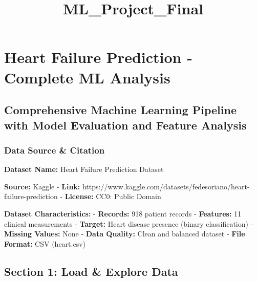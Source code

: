 \documentclass[11pt]{article}
\title{ML\_Project\_Final}
\begin{document}
    
    \maketitle
    
    

    
    \section{Heart Failure Prediction - Complete ML
Analysis}\label{heart-failure-prediction---complete-ml-analysis}

\subsection{Comprehensive Machine Learning Pipeline with Model
Evaluation and Feature
Analysis}\label{comprehensive-machine-learning-pipeline-with-model-evaluation-and-feature-analysis}

    \subsubsection{Data Source \& Citation}\label{data-source-citation}

\textbf{Dataset Name:} Heart Failure Prediction Dataset

\textbf{Source:} Kaggle - \textbf{Link:}
https://www.kaggle.com/datasets/fedesoriano/heart-failure-prediction -
\textbf{License:} CC0: Public Domain

\textbf{Dataset Characteristics:} - \textbf{Records:} 918 patient
records - \textbf{Features:} 11 clinical measurements - \textbf{Target:}
Heart disease presence (binary classification) - \textbf{Missing
Values:} None - \textbf{Data Quality:} Clean and balanced dataset -
\textbf{File Format:} CSV (heart.csv)

    \subsection{Section 1: Load \& Explore
Data}\label{section-1-load-explore-data}
\end{document}
